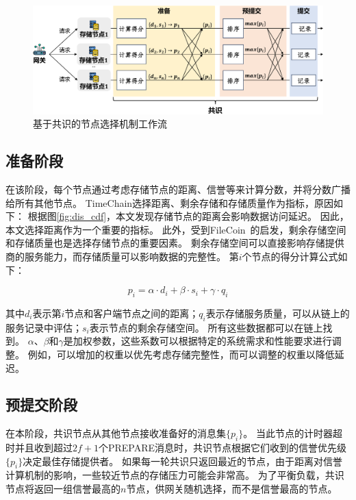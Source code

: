 \begin{figure}[t]
    \centering
    \includegraphics[width=1\linewidth]{figures/timechain/consensus.pdf}
    \caption{基于共识的节点选择机制工作流}
    \label{fig:consensus}
\end{figure}


\subsection{准备阶段}
在该阶段，每个节点通过考虑存储节点的距离、信誉等来计算分数，并将分数广播给所有其他节点。
TimeChain选择距离、剩余存储和存储质量作为指标，原因如下：
根据图\autoref{fig:dis_cdf}，本文发现存储节点的距离会影响数据访问延迟。
因此，本文选择距离作为一个重要的指标。
此外，受到FileCoin~\cite{bauer2022filecoin}的启发，剩余存储空间和存储质量也是选择存储节点的重要因素。
剩余存储空间可以直接影响存储提供商的服务能力，而存储质量可以影响数据的完整性。
第$i$个节点的得分计算公式如下：

\begin{equation} 
    \label{eq:score}
    p_i=\alpha\cdot d_i+\beta\cdot s_i+\gamma\cdot q_i
\end{equation}

其中$d_i$表示第$i$节点和客户端节点之间的距离；$q_i$表示存储服务质量，可以从链上的服务记录中评估；$s_i$表示节点的剩余存储空间。
所有这些数据都可以在链上找到。
$\alpha$、$\beta$和$\gamma$是加权参数，这些系数可以根据特定的系统需求和性能要求进行调整。
例如，可以增加的权重以优先考虑存储完整性，而可以调整的权重以降低延迟。

\subsection{预提交阶段}
在本阶段，共识节点从其他节点接收准备好的消息集$\{p_i\}$。
当此节点的计时器超时并且收到超过$2f+1$个PREPARE消息时，共识节点根据它们收到的信誉优先级$\{p_i\}$决定最佳存储提供者。
如果每一轮共识只返回最近的节点，由于距离对信誉计算机制的影响，一些较近节点的存储压力可能会非常高。
为了平衡负载，共识节点将返回一组信誉最高的$n$节点，供网关随机选择，而不是信誉最高的节点。

